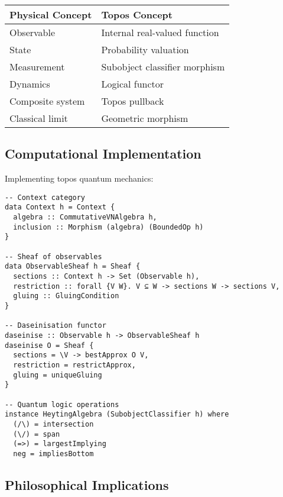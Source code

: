 \begin{theorem}
\begin{center}
\begin{tabular}{|l|l|}
\hline
\textbf{Physical Concept} & \textbf{Topos Concept} \\
\hline
Observable & Internal real-valued function \\
State & Probability valuation \\
Measurement & Subobject classifier morphism \\
Dynamics & Logical functor \\
Composite system & Topos pullback \\
Classical limit & Geometric morphism \\
\hline
\end{tabular}
\end{center}
\end{theorem}

\subsection{Computational Implementation}

Implementing topos quantum mechanics:

\begin{example}
\begin{verbatim}
-- Context category
data Context h = Context {
  algebra :: CommutativeVNAlgebra h,
  inclusion :: Morphism (algebra) (BoundedOp h)
}

-- Sheaf of observables
data ObservableSheaf h = Sheaf {
  sections :: Context h -> Set (Observable h),
  restriction :: forall {V W}. V ⊆ W -> sections W -> sections V,
  gluing :: GluingCondition
}

-- Daseinisation functor
daseinise :: Observable h -> ObservableSheaf h
daseinise O = Sheaf {
  sections = \V -> bestApprox O V,
  restriction = restrictApprox,
  gluing = uniqueGluing
}

-- Quantum logic operations
instance HeytingAlgebra (SubobjectClassifier h) where
  (/\) = intersection
  (\/) = span  
  (=>) = largestImplying
  neg = impliesBottom
\end{verbatim}
\end{example}

\subsection{Philosophical Implications}

